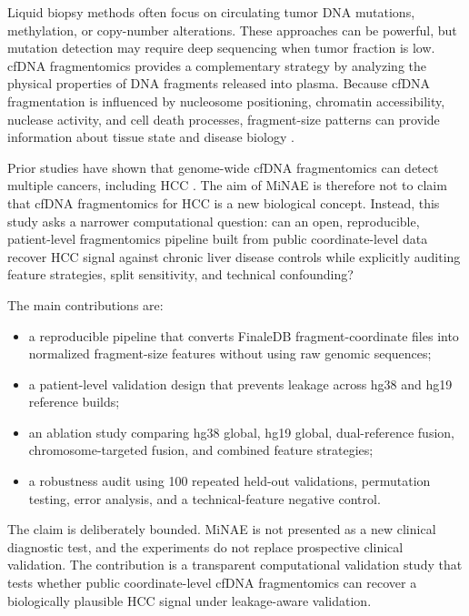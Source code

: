 \documentclass[conference]{IEEEtran}
\begin{document}
Liquid biopsy methods often focus on circulating tumor DNA mutations, methylation, or copy-number alterations. These approaches can be powerful, but mutation detection may require deep sequencing when tumor fraction is low. cfDNA fragmentomics provides a complementary strategy by analyzing the physical properties of DNA fragments released into plasma. Because cfDNA fragmentation is influenced by nucleosome positioning, chromatin accessibility, nuclease activity, and cell death processes, fragment-size patterns can provide information about tissue state and disease biology \cite{snyder2016cellfree,mouliere2011fragmentation,cristiano2019genomewide}.

Prior studies have shown that genome-wide cfDNA fragmentomics can detect multiple cancers, including HCC \cite{cristiano2019genomewide,foda2023detecting}. The aim of MiNAE is therefore not to claim that cfDNA fragmentomics for HCC is a new biological concept. Instead, this study asks a narrower computational question: can an open, reproducible, patient-level fragmentomics pipeline built from public coordinate-level data recover HCC signal against chronic liver disease controls while explicitly auditing feature strategies, split sensitivity, and technical confounding?

The main contributions are:
\begin{itemize}
    \item a reproducible pipeline that converts FinaleDB fragment-coordinate files into normalized fragment-size features without using raw genomic sequences;
    \item a patient-level validation design that prevents leakage across hg38 and hg19 reference builds;
    \item an ablation study comparing hg38 global, hg19 global, dual-reference fusion, chromosome-targeted fusion, and combined feature strategies;
    \item a robustness audit using 100 repeated held-out validations, permutation testing, error analysis, and a technical-feature negative control.
\end{itemize}

The claim is deliberately bounded. MiNAE is not presented as a new clinical diagnostic test, and the experiments do not replace prospective clinical validation. The contribution is a transparent computational validation study that tests whether public coordinate-level cfDNA fragmentomics can recover a biologically plausible HCC signal under leakage-aware validation.
\end{document}
